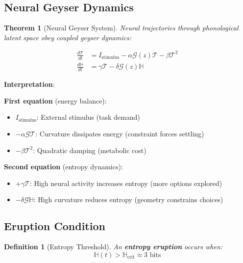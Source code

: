 \documentclass[12pt]{article}
\newtheorem{theorem}{Theorem}
\newtheorem{definition}{Definition}
\begin{document}
\subsection{Neural Geyser Dynamics}

\begin{theorem}[Neural Geyser System]
Neural trajectories through phonological latent space obey coupled geyser dynamics:

\begin{equation}\label{eq:neural_geyser}
\boxed{
\begin{aligned}
\frac{d\mathcal{T}}{dt} &= I_{\text{stimulus}} - \alpha \mathcal{G}(z) \mathcal{T} - \beta \mathcal{T}^2 \\[0.5em]
\frac{d\mathbb{H}}{dt} &= \gamma \mathcal{T} - \delta \mathcal{G}(z) \mathbb{H}
\end{aligned}
}
\end{equation}
\end{theorem}

\textbf{Interpretation}:

\textbf{First equation} (energy balance):
\begin{itemize}
\item $I_{\text{stimulus}}$: External stimulus (task demand)
\item $-\alpha \mathcal{G} \mathcal{T}$: Curvature dissipates energy (constraint forces settling)
\item $-\beta \mathcal{T}^2$: Quadratic damping (metabolic cost)
\end{itemize}

\textbf{Second equation} (entropy dynamics):
\begin{itemize}
\item $+\gamma \mathcal{T}$: High neural activity increases entropy (more options explored)
\item $-\delta \mathcal{G} \mathbb{H}$: High curvature reduces entropy (geometry constrains choices)
\end{itemize}

\subsection{Eruption Condition}

\begin{definition}[Entropy Threshold]
An \textbf{entropy eruption} occurs when:
\begin{equation}
\mathbb{H}(t) > \mathbb{H}_{\text{crit}} \approx 3 \text{ bits}
\end{equation}
\end{definition}
\end{document}
